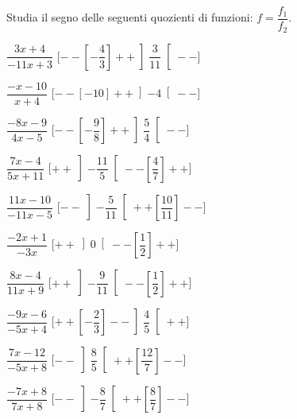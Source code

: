 \begin{esercizio}\label{ese:dis_7}
 Studia il segno delle seguenti quozienti di funzioni: 
 \(f = \dfrac {f_1}{f_2}\).
\begin{multicols}{2}
 \begin{enumeratea}
  \item  \(\dfrac{3 x +4}{-11 x +3}\) \hfill 
  [\(--\left [-\dfrac{4}{3} \right ]++\left ]\dfrac{3}{11} \right [--\)]
  \item  \(\dfrac{- x -10}{x +4}\) \hfill 
  [\(--\left [-10 \right ]++\left ]-4 \right [--\)]
  \item  \(\dfrac{-8 x -9}{4 x -5}\) \hfill 
  [\(--\left [-\dfrac{9}{8} \right ]++\left ]\dfrac{5}{4} \right [--\)]
  \item  \(\dfrac{7 x -4}{5 x +11}\) \hfill 
  [\(++\left ]-\dfrac{11}{5} \right [--\left [\dfrac{4}{7} \right ]++\)]
  \item  \(\dfrac{11 x -10}{-11 x -5}\) \hfill 
  [\(--\left ]-\dfrac{5}{11} \right [++\left [\dfrac{10}{11} \right ]--\)]
  \item  \(\dfrac{-2 x +1}{-3 x }\) \hfill 
  [\(++\left ]0 \right [--\left [\dfrac{1}{2} \right ]++\)]
  \item  \(\dfrac{8 x -4}{11 x +9}\) \hfill 
  [\(++\left ]-\dfrac{9}{11} \right [--\left [\dfrac{1}{2} \right ]++\)]
  \item  \(\dfrac{-9 x -6}{-5 x +4}\) \hfill 
  [\(++\left [-\dfrac{2}{3} \right ]--\left ]\dfrac{4}{5} \right [++\)]
  \item  \(\dfrac{7 x -12}{-5 x +8}\) \hfill 
  [\(--\left ]\dfrac{8}{5} \right [++\left [\dfrac{12}{7} \right ]--\)]
  \item  \(\dfrac{-7 x +8}{7 x +8}\) \hfill 
  [\(--\left ]-\dfrac{8}{7} \right [++\left [\dfrac{8}{7} \right ]--\)]
 \end{enumeratea}
\end{multicols}
\end{esercizio}

